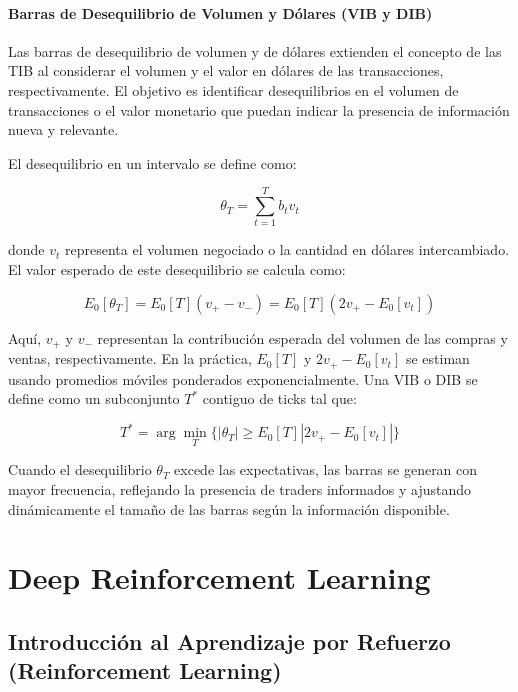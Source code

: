 \documentclass[a4paper,12pt, twoside]{report}
\begin{document}
\paragraph{Barras de Desequilibrio de Volumen y Dólares (VIB y DIB)}

Las barras de desequilibrio de volumen y de dólares extienden el concepto de las TIB al considerar el volumen 
y el valor en dólares de las transacciones, respectivamente. El objetivo es identificar desequilibrios en el volumen de 
transacciones o el valor monetario que puedan indicar la presencia de información nueva y relevante.

El desequilibrio en un intervalo se define como:

\begin{equation}
\theta_T = \sum_{t=1}^{T} b_t v_t
\end{equation}

donde \(v_t\) representa el volumen negociado o la cantidad en dólares intercambiado. El valor esperado de este desequilibrio 
se calcula como:

\begin{equation}
E_0[\theta_T] = E_0[T](v_+ - v_-) = E_0[T](2v_+ - E_0[v_t])
\end{equation}

Aquí, \(v_+\) y \(v_-\) representan la contribución esperada del volumen de las compras y ventas, respectivamente. En la 
práctica, \(E_0[T]\) y \(2v_+ - E_0[v_t]\) se estiman usando promedios móviles ponderados exponencialmente. Una VIB o DIB 
se define como un subconjunto \(T^*\) contiguo de ticks tal que:

\begin{equation}
T^* = \arg \min_{T} \{|\theta_T| \geq E_0[T]|2v_+ - E_0[v_t]| \}
\end{equation}

Cuando el desequilibrio \(\theta_T\) excede las expectativas, las barras se generan con mayor frecuencia, reflejando la 
presencia de traders informados y ajustando dinámicamente el tamaño de las barras según la información disponible.

\section{Deep Reinforcement Learning}

\subsection{Introducción al Aprendizaje por Refuerzo (Reinforcement Learning)}
\end{document}
